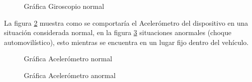 \begin{figure}[htbp!]
	\centering
	\caption{Gráfica Giroscopio normal}
	\label{fig:NotificaAutoGA}
\end{figure}

La figura \ref{fig:NotificaAutoA} muestra como se comportaría el Acelerómetro del dispositivo en una situación considerada normal, en la figura \ref{fig:NotificaAutoAA} situaciones anormales (choque automovilístico), esto mientras se encuentra en un lugar fijo dentro del vehículo.
\begin{figure}[htbp!]
	\centering
	\caption{Gráfica Acelerómetro normal}
	\label{fig:NotificaAutoA}
\end{figure}

\begin{figure}[htbp!]
	\centering
	\caption{Gráfica Acelerómetro anormal}
	\label{fig:NotificaAutoAA}
\end{figure}

